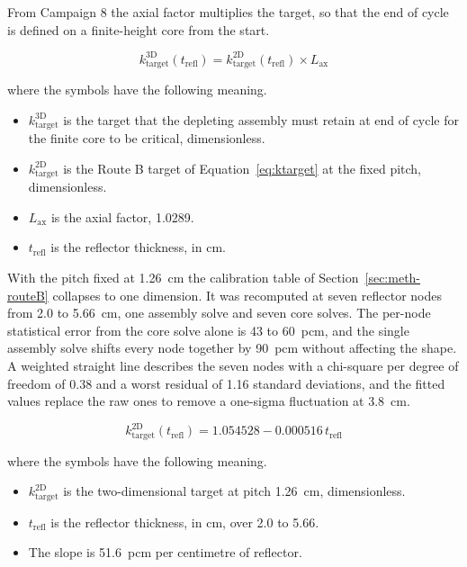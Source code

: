 From Campaign 8 the axial factor multiplies the target, so that the
end of cycle is defined on a finite-height core from the start.

\begin{equation}
k_\mathrm{target}^\mathrm{3D}(t_\mathrm{refl}) = k_\mathrm{target}^\mathrm{2D}(t_\mathrm{refl}) \times L_\mathrm{ax}
\label{eq:ktarget-3d}
\end{equation}

\noindent where the symbols have the following meaning.

\begin{itemize}
  \item $k_\mathrm{target}^\mathrm{3D}$ is the target that the depleting
        assembly must retain at end of cycle for the finite core to be
        critical, dimensionless.

  \item $k_\mathrm{target}^\mathrm{2D}$ is the Route B target of
        Equation~\eqref{eq:ktarget} at the fixed pitch, dimensionless.

  \item $L_\mathrm{ax}$ is the axial factor, \num{1.0289}.

  \item $t_\mathrm{refl}$ is the reflector thickness, in cm.
\end{itemize}

With the pitch fixed at \SI{1.26}{cm} the calibration table of
Section~\ref{sec:meth-routeB} collapses to one dimension. It was
recomputed at seven reflector nodes from 2.0 to \SI{5.66}{cm}, one
assembly solve and seven core solves. The per-node statistical error
from the core solve alone is 43 to \SI{60}{pcm}, and the single
assembly solve shifts every node together by \SI{90}{pcm} without
affecting the shape. A weighted straight line describes the seven
nodes with a chi-square per degree of freedom of 0.38 and a worst
residual of 1.16 standard deviations, and the fitted values replace the
raw ones to remove a one-sigma fluctuation at \SI{3.8}{cm}.

\begin{equation}
k_\mathrm{target}^\mathrm{2D}(t_\mathrm{refl}) = 1.054528 - 0.000516\, t_\mathrm{refl}
\label{eq:ktarget-c8-fit}
\end{equation}

\noindent where the symbols have the following meaning.

\begin{itemize}
  \item $k_\mathrm{target}^\mathrm{2D}$ is the two-dimensional target at
        pitch \SI{1.26}{cm}, dimensionless.

  \item $t_\mathrm{refl}$ is the reflector thickness, in cm, over 2.0
        to 5.66.

  \item The slope is \SI{51.6}{pcm} per centimetre of reflector.
\end{itemize}

